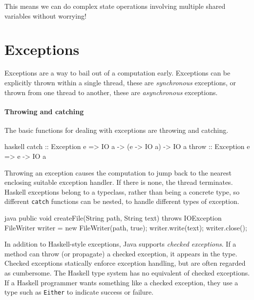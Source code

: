 This means we can do complex state operations involving multiple shared
variables without worrying!

\section{Exceptions}
\label{sec:concurrent_haskell-exc}

Exceptions are a way to bail out of a computation early.  Exceptions can be
explicitly thrown within a single thread, these are \emph{synchronous}
exceptions, or thrown from one thread to another, these are \emph{asynchronous}
exceptions.

\paragraph{Throwing and catching}
The basic functions for dealing with exceptions are throwing and
catching.

\begin{listing}
\centering
\begin{cminted}{haskell}
catch :: Exception e => IO a -> (e -> IO a) -> IO a
throw :: Exception e => e -> IO a
\end{cminted}
\caption{Exceptions in Haskell.}\label{lst:excs_haskell}
\end{listing}

Throwing an exception causes the computation to jump back to the
nearest enclosing suitable exception handler.  If there is none, the
thread terminates.  Haskell exceptions belong to a typeclass, rather
than being a concrete type, so different \verb|catch| functions can be
nested, to handle different types of exception.

\begin{listing}
\centering
\begin{cminted}{java}
public void createFile(String path, String text) throws IOException {
  FileWriter writer = new FileWriter(path, true);
  writer.write(text);
  writer.close();
}
\end{cminted}
\caption{Checked exceptions in Java.}\label{lst:excs_java}
\end{listing}

In addition to Haskell-style exceptions, Java supports \emph{checked
  exceptions}.  If a method can throw (or propagate) a checked
exception, it appears in the type.  Checked exceptions statically
enforce exception handling, but are often regarded as cumbersome.  The
Haskell type system has no equivalent of checked exceptions.  If a
Haskell programmer wants something like a checked exception, they use
a type such as \verb|Either| to indicate success or failure.

